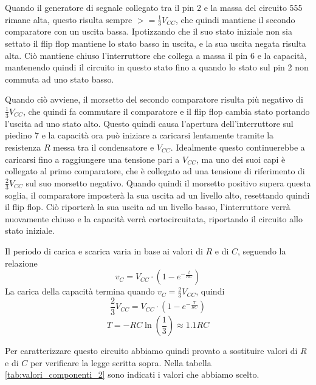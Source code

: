 \noindent
Quando il generatore di segnale collegato tra il pin 2 e la massa del circuito 555 rimane alta, questo risulta sempre $>=\frac{1}{3}V_{CC}$, che quindi mantiene il secondo comparatore con un uscita bassa. Ipotizzando che il suo stato iniziale non sia settato il flip flop mantiene lo stato basso in uscita, e la sua uscita negata risulta alta. Ciò mantiene chiuso l'interruttore che collega a massa il pin 6 e la capacità, mantenendo quindi il circuito in questo stato fino a quando lo stato sul pin 2 non commuta ad uno stato basso.

\noindent
Quando ciò avviene, il morsetto del secondo comparatore risulta più negativo di $\frac{1}{3}V_{CC}$, che quindi fa commutare il comparatore e il flip flop cambia stato portando l'uscita ad uno stato alto. Questo quindi causa l'apertura dell'interruttore sul piedino 7 e la capacità ora può iniziare a caricarsi lentamente tramite la resistenza $R$ messa tra il condensatore e $V_{CC}$. Idealmente questo continuerebbe a caricarsi fino a raggiungere una tensione pari a $V_{CC}$, ma uno dei suoi capi è collegato al primo comparatore, che è collegato ad una tensione di riferimento di $\frac{2}{3}V_{CC}$ sul suo morsetto negativo. Quando quindi il morsetto positivo supera questa soglia, il comparatore imposterà la sua uscita ad un livello alto, resettando quindi il flip flop. Ciò riporterà la sua uscita ad un livello basso, l'interruttore verrà nuovamente chiuso e la capacità verrà cortocircuitata, riportando il circuito allo stato iniziale.

\noindent
Il periodo di carica e scarica varia in base ai valori di $R$ e di $C$, seguendo la relazione
\[v_C = V_{CC}\cdot\left(1-e^{-\frac{t}{RC}}\right)\]
La carica della capacità termina quando $v_C = \frac{2}{3}V_{CC}$, quindi
\[\frac{2}{3}V_{CC} = V_{CC}\cdot\left(1-e^{-\frac{T}{RC}}\right)\]
\[T=-RC\ln\left(\frac{1}{3}\right)\approx1.1RC\]

Per caratterizzare questo circuito abbiamo quindi provato a sostituire valori di $R$ e di $C$ per verificare la legge scritta sopra. Nella tabella \ref{tab:valori_componenti_2} sono indicati i valori che abbiamo scelto.

